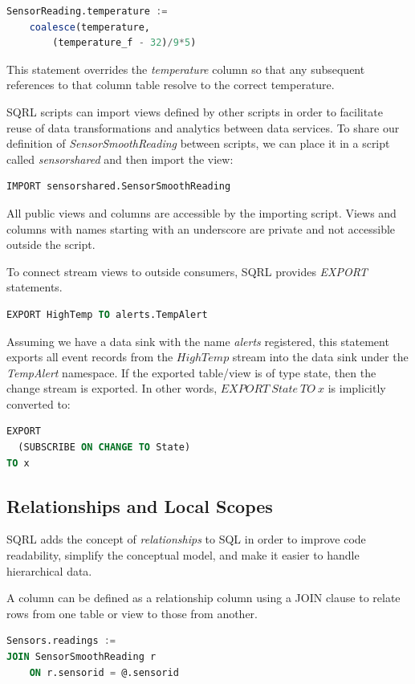 \documentclass[	DIV=calc,%
							paper=letter,%
							fontsize=11pt,%
							twocolumn]{scrartcl}	 					%
\begin{document}
\begin{lstlisting}[language=SQL]
SensorReading.temperature :=
    coalesce(temperature,
        (temperature_f - 32)/9*5)
\end{lstlisting}

This statement overrides the \emph{temperature} column so that any subsequent references to that column table resolve to the correct temperature.

SQRL scripts can import views defined by other scripts in order to facilitate reuse of data transformations and analytics between data services. To share our definition of \emph{SensorSmoothReading} between scripts, we can place it in a script called \emph{sensorshared} and then import the view:
\begin{lstlisting}[language=SQL]
IMPORT sensorshared.SensorSmoothReading
\end{lstlisting}

All public views and columns are accessible by the importing script. Views and columns with names starting with an underscore are private and not accessible outside the script.

To connect stream views to outside consumers, SQRL provides \emph{EXPORT} statements.
\begin{lstlisting}[language=SQL]
EXPORT HighTemp TO alerts.TempAlert
\end{lstlisting}
Assuming we have a data sink with the name \emph{alerts} registered, this statement exports all event records from the $HighTemp$ stream into the data sink under the \emph{TempAlert} namespace. If the exported table/view is of type state, then the change stream is exported. In other words, $EXPORT\ State\ TO\ x$ is implicitly converted to:
\begin{lstlisting}[language=SQL]
EXPORT
  (SUBSCRIBE ON CHANGE TO State)
TO x
\end{lstlisting}

\subsection{Relationships and Local Scopes}

SQRL adds the concept of \emph{relationships} to SQL in order to improve code readability, simplify the conceptual model, and make it easier to handle hierarchical data.

A column can be defined as a relationship column using a JOIN clause to relate rows from one table or view to those from another.
\begin{lstlisting}[language=SQL]
Sensors.readings :=
JOIN SensorSmoothReading r
    ON r.sensorid = @.sensorid
\end{lstlisting}
\end{document}
